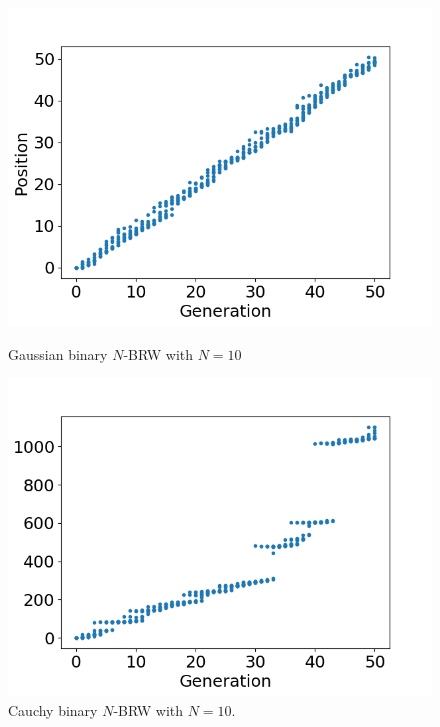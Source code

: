 \begin{figure}[!h]
\centering
\begin{minipage}{0.45\textwidth}
  \centering
  \includegraphics[width=.99\linewidth]{graphics/std_normal}
  \caption{Gaussian binary $N$-BRW with $N = 10$}
  \label{fig:normal}
\end{minipage}\hfill
\begin{minipage}{0.45\textwidth}
  \centering
  \includegraphics[width=.99\linewidth]{graphics/cauchy}
  \caption{Cauchy binary $N$-BRW with $N = 10$. }
  \label{fig:cauchy}
\end{minipage}\hfill%
\end{figure}







